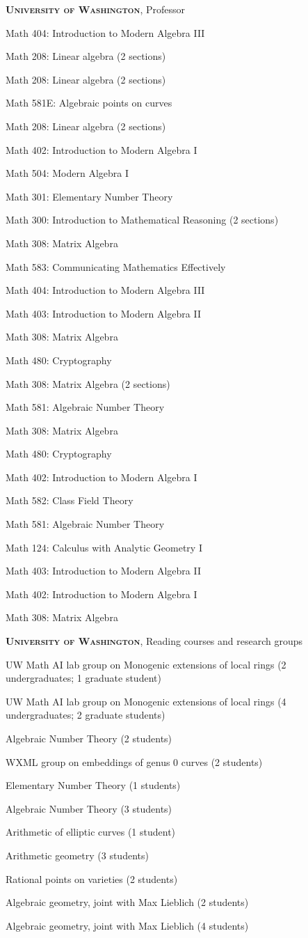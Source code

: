 \documentclass[12pt]{article}
\newenvironment{date_section}
	{
	\vspace{-1ex}
	\leftmargini = 15ex
	 \begin{itemize}[
		 labelsep = *,
		 labelwidth = 9ex,
		 labelindent = 0ex,
		 itemindent = !,
		 font=\normalfont, 
		 align=parleft
		 ]
		{}
		\itemsep=-1.5mm}
	{\end{itemize}\vspace{-2ex}}
\newcommand{\yearmo}[2]{
	\item[ 
		{\makebox[1ex][r]{#1}}
		\hspace{1ex}
		{\makebox[1ex][l]{#2} }
		] }
\begin{document}
		\begin{date_section}
			\yearmo{}{}\textbf{\textsc{University of Washington}}, Professor
			\yearmo{}{2026}%
			Math 404: Introduction to Modern Algebra III
			\yearmo{}{2025}%
			Math 208: Linear algebra (2 sections)
			\yearmo{}{}%
			Math 208: Linear algebra (2 sections)
			\yearmo{}{2024}%
			Math 581E: Algebraic points on curves
			\yearmo{}{}%
			Math 208: Linear algebra (2 sections)
			\yearmo{}{2023}%
			Math 402: Introduction to Modern Algebra I
			\yearmo{}{2022}%
			Math 504: Modern Algebra I
            \yearmo{}{2021}%
            Math 301: Elementary Number Theory
        \yearmo{}{}%
            Math 300: Introduction to Mathematical Reasoning (2 sections)
			\yearmo{}{2020}%
				Math 308: Matrix Algebra
			\yearmo{}{}%
				Math 583: Communicating Mathematics Effectively
			\yearmo{}{}%
				Math 404: Introduction to Modern Algebra III 
			\yearmo{}{}%
				Math 403: Introduction to Modern Algebra II 
			\yearmo{}{2019}%
        Math 308: Matrix Algebra 
			\yearmo{}{}%
				Math 480: Cryptography
			\yearmo{}{2018}%
                Math 308: Matrix Algebra (2 sections)
			\yearmo{}{2017}%
				Math 581: Algebraic Number Theory
			\yearmo{}{}%
				Math 308: Matrix Algebra
			\yearmo{}{}%
				Math 480: Cryptography
			\yearmo{}{2016}%
                Math 402: Introduction to Modern Algebra I
			\yearmo{}{}%
                Math 582: Class Field Theory
			\yearmo{}{2015}%
					Math 581: Algebraic Number Theory
			\yearmo{}{}
					Math 124: Calculus with Analytic Geometry I
			\yearmo{}{}%
				Math 403: Introduction to Modern Algebra II
			\yearmo{}{2014}%
					Math 402: Introduction to Modern Algebra I
			\yearmo{}{}
					Math 308: Matrix Algebra
            
			\yearmo{}{}\textbf{\textsc{University of Washington}}, Reading courses and research groups
			\yearmo{}{2026}%
				UW Math AI lab group on Monogenic extensions of local rings (2 undergraduates; 1 graduate student)
			\yearmo{}{2025}%
			UW Math AI lab group on Monogenic extensions of local rings (4 undergraduates; 2 graduate students)
			\yearmo{}{2019}%
				Algebraic Number Theory (2 students)
			\yearmo{}{}%
				WXML group on embeddings of genus 0 curves (2 students)
			\yearmo{}{2018}%
					Elementary Number Theory (1 students)
			\yearmo{}{}%
					Algebraic Number Theory (3 students)
			\yearmo{}{2017}%
				Arithmetic of elliptic curves (1 student)
			\yearmo{}{2016}%
					Arithmetic geometry (3 students)
			\yearmo{}{2015}%
					Rational points on varieties (2 students)
			\yearmo{}{}%
					Algebraic geometry, joint with Max Lieblich (2 students)
			\yearmo{}{2014}%
					Algebraic geometry, joint with Max Lieblich (4 students)


\end{date_section}
\end{document}

